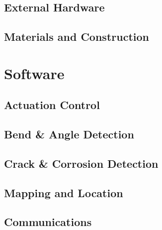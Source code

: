 \documentclass[11pt]{article}		%
\begin{document}
		\subsection{External Hardware}
	
		\subsection{Materials and Construction}
	
	\section{Software}
	
		\subsection{Actuation Control}
		
		\subsection{Bend \& Angle Detection}
		
		\subsection{Crack \& Corrosion Detection}
		
		\subsection{Mapping and Location}
		
		\subsection{Communications}
	
	\pagebreak		%
	
	
	\nocite{*} 				%
	
	\begingroup\onehalfspacing
		{\small
			
			
		}
	\endgroup
\end{document}

